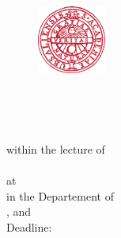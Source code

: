 
\begin{titlepage}


\begin{figure}
	\raggedright
	\includegraphics[width=0.2\textwidth]{./fig/uppsla_university.png}
\end{figure}


\begin{center}
	\vspace*{0pt}
	\begin{Huge}
		\textbf{\mytitle}\\
	\end{Huge}
	\vspace*{4em}
	\begin{LARGE}
		\textbf{\MakeUppercase{\mytypeofwork}}\\
	\end{LARGE}	
	\vspace*{2em}
	within the lecture of\\
	\mycourse\\
	\vspace*{2em}
	at \myuniversity\\
	in the Departement of \mydepartement\\
	\vspace*{2em}
	\myauthora{}, \myauthorb{} and \myauthorc\\
	\vspace*{2em}
	Deadline: \myduedate\\
	\vspace*{3em}
	\vfill
	

\end{center}
\end{titlepage}
